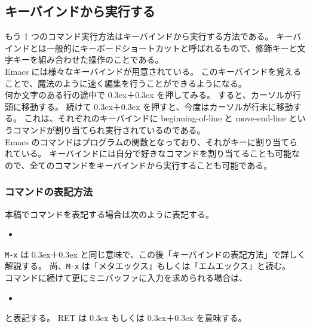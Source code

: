 \subsection{キーバインドから実行する}
もう 1 つのコマンド実行方法はキーバインドから実行する方法である。
キーバインドとは一般的にキーボードショートカットと呼ばれるもので、修飾キーと文字キーを組み合わせた操作のことである。\\

Emacs には様々なキーバインドが用意されている。
このキーバインドを覚えることで、魔法のように速く編集を行うことができるようになる。\\

何か文字のある行の途中で \raise0.3ex\hbox{}＋\raise0.3ex\hbox{} を押してみる。
すると、カーソルが行頭に移動する。
続けて \raise0.3ex\hbox{}＋\raise0.3ex\hbox{} を押すと、今度はカーソルが行末に移動する。
これは、それぞれのキーバインドに beginning-of-line と move-end-line というコマンドが割り当てられ実行されているのである。\\

Emacs のコマンドはプログラムの関数となっており、それがキーに割り当てられている。
キーバインドには自分で好きなコマンドを割り当てることも可能なので、全てのコマンドをキーバインドから実行することも可能である。
\subsubsection{コマンドの表記方法}
本稿でコマンドを表記する場合は次のように表記する。
\begin{itemize}\setlength{\leftskip}{-1.00zw}%
\item[] \texttt{}
\end{itemize}
\texttt{M-x} は \raise0.3ex\hbox{}＋\raise0.3ex\hbox{} と同じ意味で、この後「キーバインドの表記方法」で詳しく解説する。
尚、\texttt{M-x} は「メタエックス」もしくは「エムエックス」と読む。\\

コマンドに続けて更にミニバッファに入力を求められる場合は、
\begin{itemize}\setlength{\leftskip}{-1.00zw}%
\item[] \texttt{}
\end{itemize}
と表記する。
RET は \raise0.3ex\hbox{} もしくは \raise0.3ex\hbox{}＋\raise0.3ex\hbox{} を意味する。

